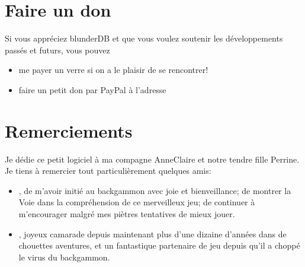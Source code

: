 \documentclass[letterpaper,10pt,french]{sphinxmanual}
\begin{document}
\chapter{Faire un don}
\label{\detokenize{index:faire-un-don}}
\sphinxAtStartPar
Si vous appréciez blunderDB et que vous voulez soutenir les développements passés et futurs, vous pouvez
\begin{itemize}
\item {} 
\sphinxAtStartPar
me payer un verre si on a le plaisir de se rencontrer!

\item {} 
\sphinxAtStartPar
faire un petit don par PayPal à l’adresse 

\end{itemize}


\chapter{Remerciements}
\label{\detokenize{index:remerciements}}
\sphinxAtStartPar
Je dédie ce petit logiciel à ma compagne Anne\sphinxhyphen{}Claire et notre tendre
fille Perrine. Je tiens à remercier tout particulièrement quelques amis:
\begin{itemize}
\item {} 
\sphinxAtStartPar
{}, de m’avoir initié au backgammon avec joie et
bienveillance; de montrer la Voie dans la compréhension de ce
merveilleux jeu; de continuer à m’encourager malgré mes piètres
tentatives de mieux jouer.

\item {} 
\sphinxAtStartPar
{}, joyeux camarade depuis maintenant plus d’une dizaine
d’années dans de chouettes aventures, et un fantastique partenaire de jeu
depuis qu’il a choppé le virus du backgammon.

\end{itemize}



\renewcommand{\indexname}{Index}
\printindex
\end{document}
